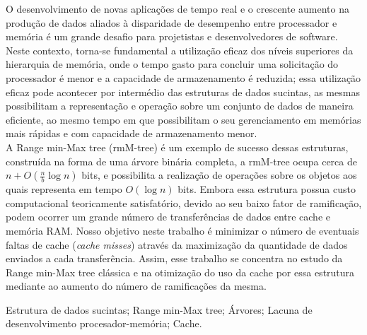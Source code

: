 O desenvolvimento de novas aplicações de tempo real e o crescente aumento na produção de dados aliados à disparidade de desempenho entre processador 
e memória é um grande desafio para projetistas e desenvolvedores de software.
Neste contexto, torna-se fundamental a utilização eficaz dos níveis superiores da hierarquia de memória, onde o tempo gasto para concluir uma 
solicitação do processador é menor e a capacidade de armazenamento é  reduzida; essa utilização eficaz pode acontecer por intermédio das estruturas 
de dados sucintas, as mesmas possibilitam a representação e operação sobre um conjunto de dados de maneira eficiente, ao mesmo tempo em que possibilitam 
o seu gerenciamento em memórias mais rápidas e com capacidade de armazenamento menor.\\
A Range min-Max tree (rmM-tree) é um exemplo de sucesso dessas estruturas, construída na forma de uma árvore binária completa, a 
rmM-tree ocupa cerca de $n + O(\frac{n}{b} \log n)$ bits, e possibilita a realização de operações sobre os objetos aos quais representa em 
tempo $O(\log n)$ bits. Embora essa estrutura possua custo computacional teoricamente 
satisfatório, devido ao seu baixo fator de ramificação, podem ocorrer um grande número de transferências de dados entre cache e memória RAM. 
Nosso objetivo neste trabalho é minimizar o número de eventuais faltas de cache (\textit{cache misses}) através da maximização da quantidade de dados 
enviados a cada transferência. Assim, esse trabalho se concentra no estudo da Range min-Max tree clássica e na otimização do uso da cache por essa 
estrutura mediante ao aumento do número de ramificações da mesma.
\begin{keywords}
Estrutura de dados sucintas; Range min-Max tree; Árvores; Lacuna de desenvolvimento procesador-memória; Cache.
\end{keywords}